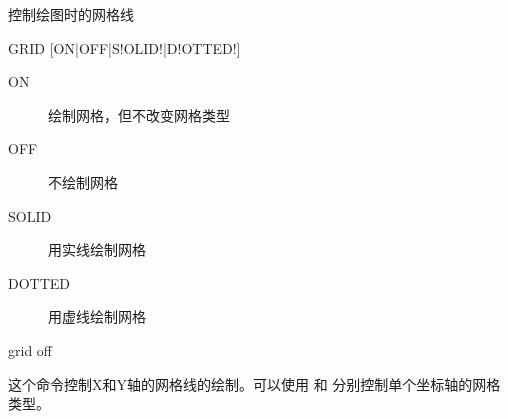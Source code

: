 \label{cmd:grid}

控制绘图时的网格线

\begin{SACSTX}
GRID [ON|OFF|S!OLID!|D!OTTED!]
\end{SACSTX}

\begin{description}
\item [ON] 绘制网格，但不改变网格类型
\item [OFF] 不绘制网格
\item [SOLID] 用实线绘制网格
\item [DOTTED] 用虚线绘制网格
\end{description}

\begin{SACDFT}
grid off
\end{SACDFT}

这个命令控制X和Y轴的网格线的绘制。可以使用  和
 分别控制单个坐标轴的网格类型。
